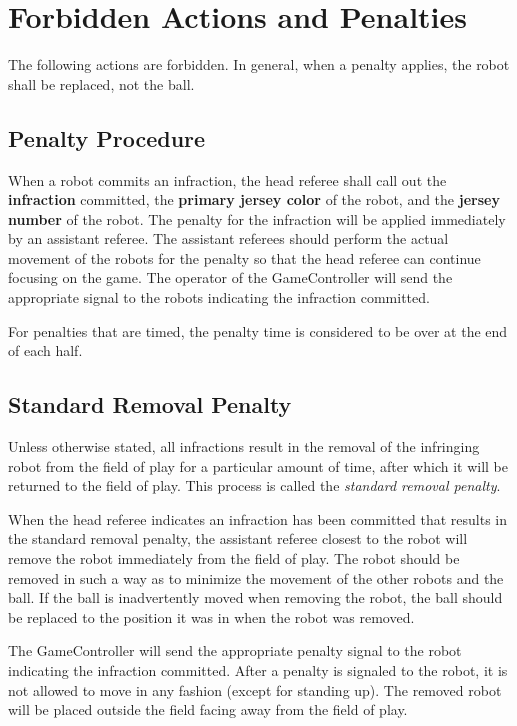 \section{Forbidden Actions and Penalties}
\label{sec:forbidden_act}

The following actions are forbidden. In general, when a penalty applies, the robot shall be replaced, not the ball.

\subsection{Penalty Procedure}
\label{sec:penalty_procedure}

When a robot commits an infraction, the head referee shall call out the \textbf{infraction} committed, the \textbf{primary jersey color} of the robot, and the \textbf{jersey number} of the robot. The penalty for the infraction will be applied immediately by an assistant referee. The assistant referees should perform the actual movement of the robots for the penalty so that the head referee can continue focusing on the game. The operator of the GameController will send the appropriate signal to the robots indicating the infraction committed.

For penalties that are timed, the penalty time is considered to be over at the end of each half.

\subsection{Standard Removal Penalty}
\label{sec:removal_penalty}

Unless otherwise stated, all infractions result in the removal of the infringing robot from the field of play for a particular amount of time, after which it will be returned to the field of play. This process is called the \textit{standard removal penalty}.

When the head referee indicates an infraction has been committed that results in the standard removal penalty, the assistant referee closest to the robot will remove the robot immediately from the field of play. The robot should be removed in such a way as to minimize the movement of the other robots and the ball. If the ball is inadvertently moved when removing the robot, the ball should be replaced to the position it was in when the robot was removed.

The GameController will send the appropriate penalty signal to the robot indicating the infraction committed. After a penalty is signaled to the robot, it is not allowed to move in any fashion (except for standing up). The removed robot will be placed outside the field facing away from the field of play.

